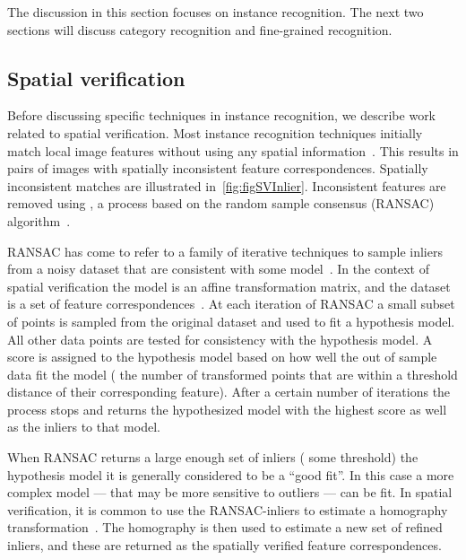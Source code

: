     The discussion in this section focuses on instance recognition.
    The next two sections will discuss category recognition and fine-grained recognition.

    \subsection{Spatial verification}\label{subsec:sverreview}
        Before discussing specific techniques in instance recognition, we describe work related to spatial
        verification. Most instance recognition techniques initially match local image features without using any
        spatial information~\cite{lowe_distinctive_2004, sivic_efficient_2009, philbin_object_2007,
        tolias_image_2015}. This results in pairs of images with spatially inconsistent feature correspondences.
        Spatially inconsistent matches are illustrated in~\cref{fig:figSVInlier}. Inconsistent features are removed
        using , a process based on the random sample consensus (RANSAC)
        algorithm~\cite{fischler_random_1981}.

        RANSAC has come to refer to a family of iterative techniques to sample inliers from a noisy dataset that
        are consistent with some model~\cite{fischler_random_1981, hartley_multiple_2003, chum_locally_2003,
        raguram_usac_2013}. In the context of spatial verification the model is an affine transformation matrix,
        and the dataset is a set of feature correspondences~\cite{lowe_distinctive_2004, sivic_video_2003,
        philbin_object_2007, chum_total_2011, arandjelovic_three_2012}. At each iteration of RANSAC a small subset
        of points is sampled from the original dataset and used to fit a hypothesis model. All other data points
        are tested for consistency with the hypothesis model. A score is assigned to the hypothesis model based on
        how well the out of sample data fit the model (\eg{} the number of transformed points that are within a
        threshold distance of their corresponding feature). After a certain number of iterations the process stops
        and returns the hypothesized model with the highest score as well as the inliers to that model.

        When RANSAC returns a large enough set of inliers (\wrt{} some threshold) the hypothesis model it is
        generally considered to be a ``good fit''. In this case a more complex model --- that may be more sensitive
        to outliers --- can be fit. In spatial verification, it is common to use the RANSAC-inliers to estimate a
        homography transformation~\cite[311--320]{szeliski_computer_2010}. The homography is then used to estimate
        a new set of refined inliers, and these are returned as the spatially verified feature correspondences.

